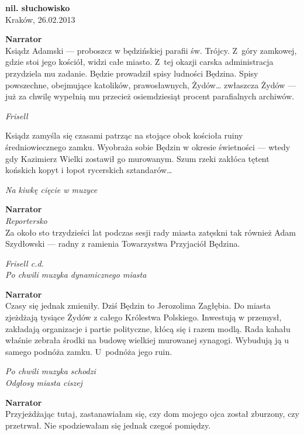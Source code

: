 \documentclass[11pt,a4paper,oneside]{article}
\begin{document}
\noindent
\textbf{nil. słuchowisko}\\
Kraków, 26.02.2013

\textbf{Narrator}\\
Ksiądz Adamski --- proboszcz w będzińskiej parafii św. Trójcy.  Z~góry
zamkowej, gdzie stoi jego kościół, widzi całe miasto.  Z~tej okazji
carska administracja przydziela mu zadanie. Będzie prowadził spisy
ludności Będzina.  Spisy powszechne, obejmujące  katolików, prawosławnych, Żydów\dots{} zwłaszcza
Żydów --- już za chwilę wypełnią mu przecież osiemdziesiąt procent
parafialnych archiwów. 

{\color{light-gray} \emph{Frisell}}

Ksiądz zamyśla się czasami patrząc na stojące obok kościoła ruiny
średniowiecznego zamku. Wyobraża sobie Będzin w okresie świetności ---
wtedy gdy Kazimierz Wielki zostawił go murowanym. Szum rzeki zakłóca
tętent końskich kopyt i łopot rycerskich sztandarów\dots{}

{\color{light-gray} \emph{Na kiwkę cięcie w muzyce}}

\textbf{Narrator}\\
{\color{light-gray} \emph{Reportersko}}\\
Za około sto trzydzieści lat podczas sesji rady miasta zatęskni tak również Adam
Szydłowski --- radny z ramienia Towarzystwa Przyjaciół Będzina.

{\color{light-gray} \emph{Frisell c.d.}}\\
{\color{light-gray} \emph{Po chwili muzyka dynamicznego miasta}}

\textbf{Narrator}\\
Czasy się jednak zmieniły. Dziś Będzin to Jerozolima Zagłębia.  Do
miasta zjeżdżają tysiące Żydów z całego Królestwa Polskiego.
Inwestują w przemysł, zakładają organizacje i partie polityczne, kłócą
się i razem modlą.  Rada kahału właśnie zebrała środki na budowę
wielkiej murowanej synagogi. Wybudują ją u samego podnóża zamku.
U~podnóża jego ruin.

{\color{light-gray} \emph{Po chwili muzyka schodzi}}\\
{\color{light-gray} \emph{Odgłosy miasta ciszej}}

\textbf{Narrator}\\
Przyjeżdżając tutaj, zastanawiałam się, czy dom
 mojego ojca został
zburzony, czy przetrwał. Nie spodziewałam się jednak czegoś pomiędzy.
\end{document}
